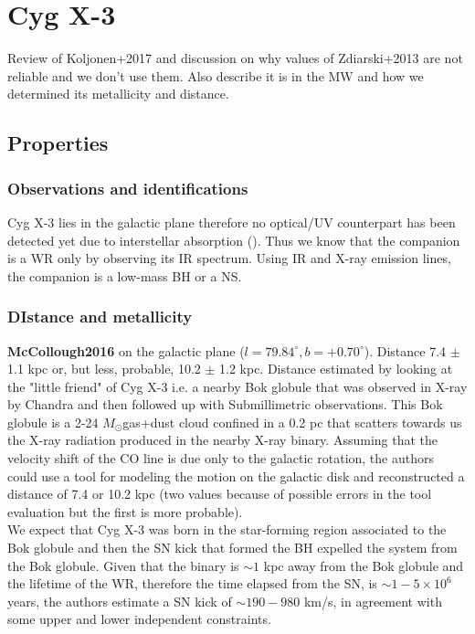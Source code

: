 \documentclass[a4paper,titlepage]{book}     	%
\newcommand{\sun}{\ensuremath{_\odot}}
\newcommand{\msun}{\ensuremath{M\sun}}
\begin{document}
\section{Cyg X-3}
Review of Koljonen+2017 and discussion on why values of Zdiarski+2013 are not reliable and we don't use them. Also describe it is in the MW and how we determined its metallicity and distance.
\subsection{Properties}

\subsubsection{Observations and identifications}
Cyg X-3 lies in the galactic plane therefore no optical/UV counterpart has been detected yet due to interstellar absorption (\cite{CygX-3_Koljonen2017}). Thus we know that the companion is a WR only by observing its IR spectrum. Using IR and X-ray emission lines, the companion is a low-mass BH or a NS.

\subsubsection{DIstance and metallicity}
\textbf{McCollough2016} on the galactic plane ($l=79.84^\circ, b=+0.70^\circ$). Distance 7.4 $\pm$ 1.1 kpc or, but less, probable, 10.2 $\pm$ 1.2 kpc. Distance estimated by looking at the "little friend" of Cyg X-3 i.e. a nearby Bok globule that was observed in X-ray by Chandra and then followed up with Submillimetric observations. This Bok globule is a 2-24 \msun gas+dust cloud confined in a 0.2 pc that scatters towards us the X-ray radiation produced in the nearby X-ray binary. Assuming that the velocity shift of the CO line is due only to the galactic rotation, the authors could use a tool for modeling the motion on the galactic disk and reconstructed a distance of 7.4 or 10.2 kpc (two values because of possible errors in the tool evaluation but the first is more probable).\\

We expect that Cyg X-3 was born in the star-forming region associated to the Bok globule and then the SN kick that formed the BH expelled the system from the Bok globule. Given that the binary is $\sim 1$ kpc away from the Bok globule and the lifetime of the WR, therefore the time elapsed from the SN, is $\sim 1-5 \times 10^6$ years, the authors estimate a SN kick of $\sim 190-980$ km/s, in agreement with some upper and lower independent constraints.\\
\end{document}
